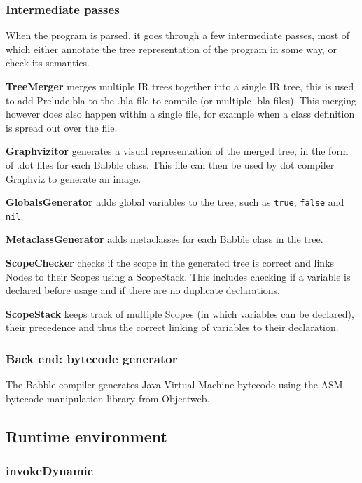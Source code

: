 \documentclass[a4paper]{article}
\begin{document}
\subsubsection{Intermediate passes}

When the program is parsed, it goes through a few intermediate passes, most of which either annotate the tree representation of the program in some way, or check its semantics.

\textbf{TreeMerger} merges multiple IR trees together into a single IR tree, this is used to add Prelude.bla to the .bla file to compile (or multiple .bla files). This merging however does also happen within a single file, for example when a class definition is spread out over the file.

\textbf{Graphvizitor} generates a visual representation of the merged tree, in the form of .dot files for each Babble class. This file can then be used by dot compiler Graphviz to generate an image.

\textbf{GlobalsGenerator} adds global variables to the tree, such as \texttt{true}, \texttt{false} and \texttt{nil}.

\textbf{MetaclassGenerator} adds metaclasses for each Babble class in the tree.

\textbf{ScopeChecker} checks if the scope in the generated tree is correct and links Nodes to their Scopes using a ScopeStack. This includes checking if a variable is declared before usage and if there are no duplicate declarations.

\textbf{ScopeStack} keeps track of multiple Scopes (in which variables can be declared), their precedence and thus the correct linking of variables to their declaration.

\subsubsection{Back end: bytecode generator}

The Babble compiler generates Java Virtual Machine bytecode using the ASM bytecode manipulation library from Objectweb.

\subsection{Runtime environment}

\subsubsection{invokeDynamic}
\end{document}
